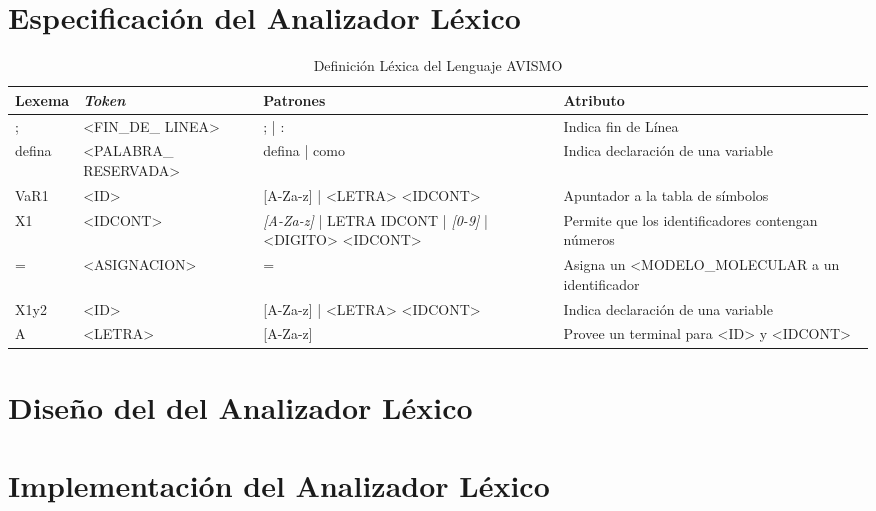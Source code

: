 \section{Especificación del Analizador Léxico}

\begin{table}[ht]
    \footnotesize
    \begin{tabularx}{\linewidth}{|X|X|X|X|}
        \hline
        Lexema & \textit{Token}        & Patrones                                                              & Atributo                                          \\\hline
        ;      & <FIN\_DE\_ LINEA>     & ; | :                                                                 & Indica fin de Línea                               \\\hline
        defina & <PALABRA\_ RESERVADA> & defina | como                                                         & Indica declaración de una variable                \\\hline
        VaR1   & <ID>                  & [A-Za-z] | <LETRA> <IDCONT>                                           & Apuntador a la tabla de símbolos                  \\\hline
        X1     & <IDCONT>              & \textit{[A-Za-z]} | LETRA IDCONT | \textit{[0-9]} | <DIGITO> <IDCONT> & Permite que los identificadores contengan números \\\hline
        =      & <ASIGNACION>          & =                                                                     & Asigna un <MODELO\_MOLECULAR a un identificador   \\\hline
        X1y2   & <ID>                  & [A-Za-z] | <LETRA> <IDCONT>                                           & Indica declaración de una variable                \\\hline
        A      & <LETRA>               & [A-Za-z]                                                              & Provee un terminal para <ID> y <IDCONT>           \\\hline
    \end{tabularx}
    \label{table: lexTable}
    \caption{Definición Léxica del Lenguaje AVISMO}
\end{table}

\section{Diseño del del Analizador Léxico}

\begin{center}
\end{center}


\section{Implementación del Analizador Léxico}